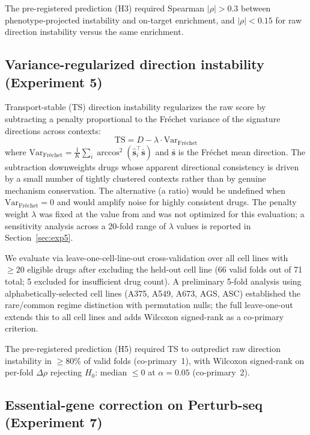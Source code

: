 \documentclass[11pt]{article}
\begin{document}
The pre-registered prediction (H3) required Spearman $|\rho| > 0.3$ between
phenotype-projected instability and on-target enrichment, and $|\rho| < 0.15$
for raw direction instability versus the same enrichment.

\subsection{Variance-regularized direction instability (Experiment 5)}

Transport-stable (TS) direction instability regularizes the raw score by
subtracting a penalty proportional to the Fr\'{e}chet variance of the
signature directions across contexts:
\begin{equation}
  \text{TS} = D - \lambda \cdot \text{Var}_{\text{Fr\'echet}}
  \label{eq:ts}
\end{equation}
where $\text{Var}_{\text{Fr\'echet}} = \frac{1}{K}\sum_i
\arccos^2(\hat{\mathbf{s}}_i^\top \bar{\mathbf{s}})$ and
$\bar{\mathbf{s}}$ is the Fr\'echet mean direction. The subtraction downweights drugs whose apparent directional consistency
is driven by a small number of tightly clustered contexts rather than by
genuine mechanism conservation. The alternative (a ratio) would be
undefined when $\text{Var}_{\text{Fr\'echet}} = 0$ and would amplify
noise for highly consistent drugs. The penalty weight $\lambda$ was fixed
at the value from \citet{tower2026drug} and was not optimized for this
evaluation; a sensitivity analysis across a 20-fold range of $\lambda$
values is reported in Section~\ref{sec:exp5}.

We evaluate via leave-one-cell-line-out cross-validation over all cell
lines with $\geq 20$ eligible drugs after excluding the held-out cell line
(66 valid folds out of 71 total; 5 excluded for insufficient drug count).
A preliminary 5-fold analysis using alphabetically-selected cell lines
(A375, A549, A673, AGS, ASC) established the rare/common regime distinction
with permutation nulls; the full leave-one-out extends this to all cell
lines and adds Wilcoxon signed-rank as a co-primary criterion.

The pre-registered prediction (H5) required TS to outpredict raw direction instability
in $\geq 80\%$ of valid folds (co-primary~1), with Wilcoxon signed-rank on
per-fold $\Delta\rho$ rejecting $H_0$: median $\leq 0$ at $\alpha = 0.05$
(co-primary~2).

\subsection{Essential-gene correction on Perturb-seq (Experiment 7)}
\end{document}
